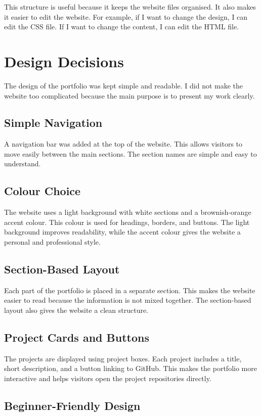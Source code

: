 \documentclass[12pt,a4paper]{article}
\begin{document}
This structure is useful because it keeps the website files organised. It also makes it easier to edit the website. For example, if I want to change the design, I can edit the CSS file. If I want to change the content, I can edit the HTML file.
\section{Design Decisions}

The design of the portfolio was kept simple and readable. I did not make the website too complicated because the main purpose is to present my work clearly.

\subsection{Simple Navigation}
A navigation bar was added at the top of the website. This allows visitors to move easily between the main sections. The section names are simple and easy to understand.

\subsection{Colour Choice}

The website uses a light background with white sections and a brownish-orange accent colour. This colour is used for headings, borders, and buttons.
The light background improves readability, while the accent colour gives the website a personal and professional style.

\subsection{Section-Based Layout}

Each part of the portfolio is placed in a separate section. This makes the website easier to read because the information is not mixed together.
The section-based layout also gives the website a clean structure.
\subsection{Project Cards and Buttons}

The projects are displayed using project boxes. Each project includes a title, short description, and a button linking to GitHub.
This makes the portfolio more interactive and helps visitors open the project repositories directly.

\subsection{Beginner-Friendly Design}
\end{document}
